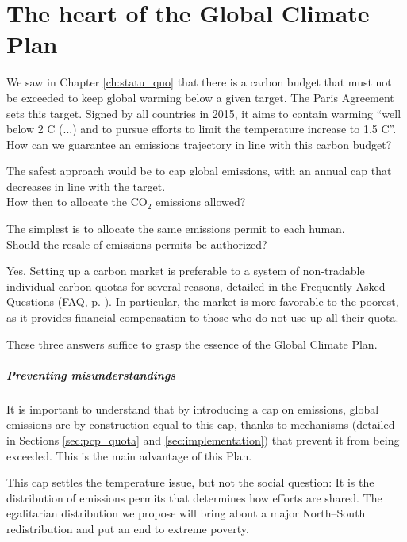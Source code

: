 \documentclass[a5paper,english,openany]{memoir}
\begin{document}
\chapter{The heart of the Global Climate Plan\label{ch:coeur}}

We saw in Chapter \ref{ch:statu_quo} that there is a carbon budget that must not be exceeded to keep global warming below a given target. The Paris Agreement sets this target. Signed by all countries in 2015, it aims to contain warming ``well below 2 \textdegree{}C (...) and to pursue efforts to limit the temperature increase to 1.5 \textdegree{}C''. \\

How can we guarantee an emissions trajectory in line with this carbon budget? 

The safest approach would be to cap global emissions, with an annual cap that decreases in line with the target. \\

How then to allocate the CO$_\text{2}$ emissions allowed? 

The simplest %
is to allocate the same emissions permit to each human. \\

Should the resale of emissions permits be authorized? 

Yes, %
Setting up a carbon market is preferable to a system of non-tradable individual carbon quotas for several reasons, detailed in the Frequently Asked Questions (FAQ, p. \pageref{q:rationing}). In particular, the market is more favorable to the poorest, as it provides financial compensation to those who do not use up all their quota.

These three answers suffice to grasp the essence of the Global Climate Plan.

\paragraph{Preventing misunderstandings}
It is important to understand that by introducing a cap on emissions, global emissions are by construction equal to this cap, thanks to mechanisms (detailed in Sections \ref{sec:pcp_quota} and \ref{sec:implementation}) that prevent it from being exceeded. This is the main advantage of this Plan.

This cap settles the temperature issue, %
but not the social question: It is the distribution of emissions permits that determines how efforts are shared. The egalitarian distribution we propose will bring about a major North--South redistribution and put an end to extreme poverty. 
\end{document}
